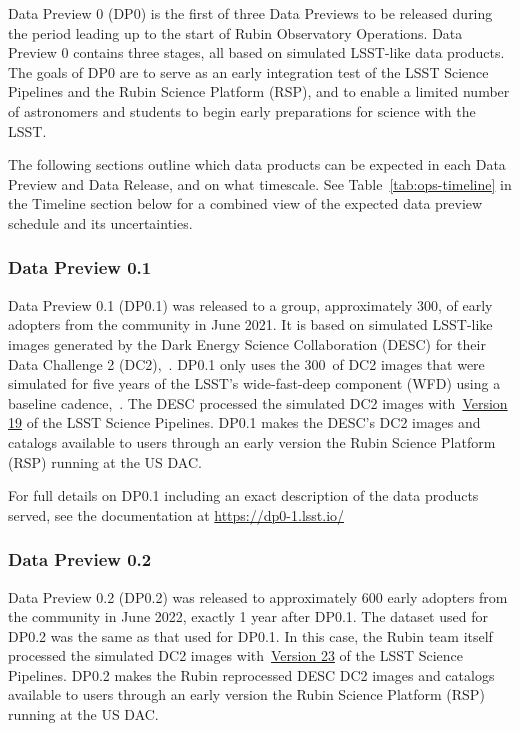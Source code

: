 Data Preview 0 (DP0) is the first of three Data Previews to be released during the period leading up to the start of Rubin Observatory Operations. 
Data Preview 0 contains three stages, all based on simulated LSST-like data products. 
The goals of DP0 are to serve as an early integration test of the LSST Science Pipelines and the Rubin Science Platform (RSP), and to enable a limited number of astronomers and students to begin early preparations for science with the LSST.

The following sections outline which data products can be expected in each Data Preview and Data Release, and on what timescale.
See Table~\ref{tab:ops-timeline} in the Timeline section below for a combined view of the expected data preview schedule and its uncertainties.

\subsubsection{Data Preview 0.1}
\label{sec:dp01}

Data Preview 0.1 (DP0.1) was released to a group, approximately 300,  of early adopters from the community in June 2021. 
It is based on simulated LSST-like images generated by the Dark Energy Science Collaboration (DESC) for their Data Challenge 2 (DC2),~\citep{2021ApJS..253...31L}.
DP0.1 only uses the 300~\sqdeg of DC2 images that were simulated for five years of the LSST’s wide-fast-deep component (WFD) using a baseline cadence,~.
The DESC processed the simulated DC2 images with~\href{https://pipelines.lsst.io/v/v19_0_0/index.html}{Version 19} of the LSST Science Pipelines.
DP0.1 makes the DESC’s DC2 images and catalogs available to users through an early version the Rubin Science Platform (RSP) running at the US DAC. 

For full details on DP0.1 including an exact description of the data products served, see the documentation at \url{https://dp0-1.lsst.io/}

\subsubsection{Data Preview 0.2}
\label{sec:dp02}

Data Preview 0.2 (DP0.2) was released to approximately 600 early adopters from the community in June 2022, exactly 1 year after DP0.1. 
The dataset used for DP0.2 was the same as that used for DP0.1.
In this case, the Rubin team itself processed the simulated DC2 images with~\href{https://pipelines.lsst.io/v/v23_0_0/index.html}{Version 23} of the LSST Science Pipelines.
DP0.2 makes the Rubin reprocessed DESC DC2 images and catalogs available to users through an early version the Rubin Science Platform (RSP) running at the US DAC. 


